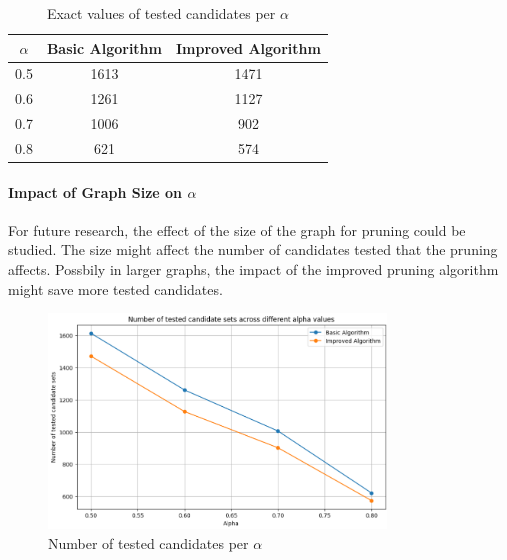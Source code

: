 \begin{table}[h]
    \centering
    \begin{tabular}{ccc}
        \hline
        \(\alpha\) & Basic Algorithm & Improved Algorithm \\
        \hline
        0.5        & 1613            & 1471               \\
        0.6        & 1261            & 1127               \\
        0.7        & 1006            & 902                \\
        0.8        & 621             & 574                \\
        \hline
    \end{tabular}
    \caption{Exact values of tested candidates per  \(\alpha\)}
    \label{tab:tested_candidates} %
\end{table}


\paragraph{Impact of Graph Size on \(\alpha\)}
For future research, the effect of the size of the graph for pruning could be studied. The size might affect the number of candidates tested that the pruning affects. Possbily in larger graphs, the impact of the improved pruning algorithm might save more tested candidates.

\begin{figure}[h]
    \centering
    \includegraphics[width=0.8\textwidth]
    {figures/improved_algorithm.png}
    \caption{Number of tested candidates per \(\alpha\)}
    \label{fig:improved_algorithm}
\end{figure}

